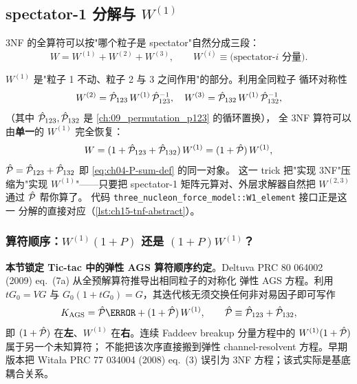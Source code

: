 \subsection{spectator-1 分解与 \(W^{(1)}\)}
\label{subsec:ch15-spectator-1}

3NF 的全算符可以按"哪个粒子是 spectator"自然分成三段：
\begin{equation}
\label{eq:ch15-3NF-decomp}
W = W^{(1)} + W^{(2)} + W^{(3)},
\qquad
W^{(i)} \equiv \text{(spectator-\(i\) 分量)}.
\end{equation}

\(W^{(1)}\) 是"粒子 1 不动、粒子 2 与 3 之间作用"的部分。利用全同粒子
循环对称性
\begin{equation}
\label{eq:ch15-W-cyclic}
W^{(2)} = \hat{\mathcal{P}}_{123}\, W^{(1)}\, \hat{\mathcal{P}}_{123}^{-1},
\quad
W^{(3)} = \hat{\mathcal{P}}_{132}\, W^{(1)}\, \hat{\mathcal{P}}_{132}^{-1},
\end{equation}
（其中 \(\hat{\mathcal{P}}_{123}, \hat{\mathcal{P}}_{132}\) 是 \cref{ch:09_permutation_p123} 的循环置换），
全 3NF 算符可以由\textbf{单一}的 \(W^{(1)}\) 完全恢复：
\begin{equation}
\label{eq:ch15-W-full}
W = (1 + \hat{\mathcal{P}}_{123} + \hat{\mathcal{P}}_{132})\, W^{(1)} = (1 + \hat{\mathcal{P}})\, W^{(1)},
\end{equation}
\(\hat{\mathcal{P}} = \hat{\mathcal{P}}_{123} + \hat{\mathcal{P}}_{132}\) 即 \cref{eq:ch04-P-sum-def} 的同一对象。
这一 trick 把"实现 3NF"压缩为"实现 \(W^{(1)}\)"——只要把 spectator-1
矩阵元算对、外层求解器自然把 \(W^{(2,3)}\) 通过 \(\hat{\mathcal{P}}\) 帮你算了。
代码 \texttt{three\_nucleon\_force\_model::W1\_element} 接口正是这一
分解的直接对应（\cref{lst:ch15-tnf-abstract}）。

\subsubsection{算符顺序：\(W^{(1)}(1+P)\) 还是 \((1+P)W^{(1)}\)？}
\label{subsubsec:ch15-operator-order}

\textbf{本节锁定 Tic-tac 中的弹性 AGS 算符顺序约定}。Deltuva
PRC 80 064002 (2009) eq.~(7a) 从全预解算符推导出相同粒子的对称化
弹性 AGS 方程。利用 \(tG_0=VG\) 与
\(G_0(1+tG_0)=G\)，其迭代核无须交换任何非对易因子即可写作
\begin{equation}
\label{eq:ch15-AGS-kernel}
K_{\rm AGS} = \Pop\V + (1 + \Pop)\,W^{(1)},
\qquad
\Pop \equiv \Pop_{123} + \Pop_{132},
\end{equation}
即 \((1+\hat{\mathcal{P}})\) 在\textbf{左}、\(W^{(1)}\) 在\textbf{右}。连续
Faddeev breakup 分量方程中的 \(W^{(1)}(1+\hat{\mathcal{P}})\) 属于另一个未知算符；
不能把该次序直接搬到弹性 channel-resolvent 方程。早期版本把 Witała
PRC 77 034004 (2008) eq.~(3) 误引为 3NF 方程；该式实际是基底耦合关系。

